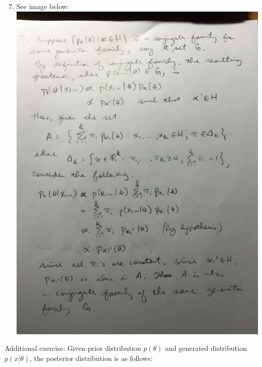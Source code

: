 \documentclass{article}
\begin{document}
\begin{enumerate}
\setcounter{enumi}{6}
\pagebreak
\item See image below: \\
\includegraphics[scale=0.18]{pic.jpg}

\end{enumerate}

\pagebreak
Additional exercise: Given prior distribution $p(\theta)$ and generated distribution $p(x|\theta)$, the posterior distribution is as follows:
\end{document}
